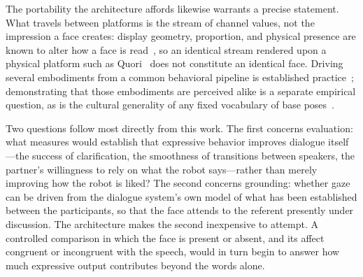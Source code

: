 The portability the architecture affords likewise warrants a precise
statement. What travels between platforms is the stream of channel values, not
the impression a face creates: display geometry, proportion, and physical
presence are known to alter how a face is read~\cite{broadbent2013screenface,
longface2026}, so an identical stream rendered upon a physical platform such
as Quori~\cite{specian2021quori} does not constitute an identical face.
Driving several embodiments from a common behavioral pipeline is established
practice~\cite{hartholt2019vhtoolkit}; demonstrating that those embodiments are
perceived alike is a separate empirical question, as is the cultural generality
of any fixed vocabulary of base poses~\cite{chen2019culturalexpr}.

Two questions follow most directly from this work. The first concerns
evaluation: what measures would establish that expressive behavior improves
dialogue itself---the success of clarification, the smoothness of transitions
between speakers, the partner's willingness to rely on what the robot
says---rather than merely improving how the robot is liked? The second concerns
grounding: whether gaze can be driven from the dialogue system's own model of
what has been established between the participants, so that the face attends to
the referent presently under discussion. The architecture makes the second
inexpensive to attempt. A controlled comparison in which the face is present or
absent, and its affect congruent or incongruent with the speech, would in turn
begin to answer how much expressive output contributes beyond the words alone.

